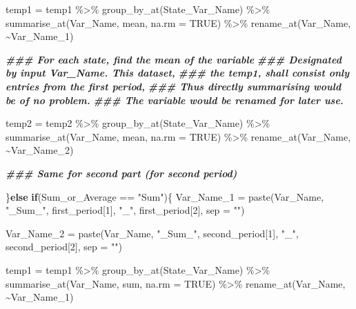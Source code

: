 \documentclass[
]{article}
\newenvironment{Shaded}{\begin{snugshade}}{\end{snugshade}}
\newcommand{\AttributeTok}[1]{\textcolor[rgb]{0.77,0.63,0.00}{#1}}
\newcommand{\ConstantTok}[1]{\textcolor[rgb]{0.00,0.00,0.00}{#1}}
\newcommand{\ControlFlowTok}[1]{\textcolor[rgb]{0.13,0.29,0.53}{\textbf{#1}}}
\newcommand{\DecValTok}[1]{\textcolor[rgb]{0.00,0.00,0.81}{#1}}
\newcommand{\DocumentationTok}[1]{\textcolor[rgb]{0.56,0.35,0.01}{\textbf{\textit{#1}}}}
\newcommand{\FunctionTok}[1]{\textcolor[rgb]{0.00,0.00,0.00}{#1}}
\newcommand{\NormalTok}[1]{#1}
\newcommand{\OtherTok}[1]{\textcolor[rgb]{0.56,0.35,0.01}{#1}}
\newcommand{\SpecialCharTok}[1]{\textcolor[rgb]{0.00,0.00,0.00}{#1}}
\newcommand{\StringTok}[1]{\textcolor[rgb]{0.31,0.60,0.02}{#1}}
\begin{document}
\begin{Shaded}
\begin{Highlighting}[]
\NormalTok{    temp1 }\OtherTok{=}\NormalTok{ temp1 }\SpecialCharTok{\%\textgreater{}\%} 
      \FunctionTok{group\_by\_at}\NormalTok{(State\_Var\_Name) }\SpecialCharTok{\%\textgreater{}\%}
      \FunctionTok{summarise\_at}\NormalTok{(Var\_Name, mean, }\AttributeTok{na.rm =} \ConstantTok{TRUE}\NormalTok{) }\SpecialCharTok{\%\textgreater{}\%}
      \FunctionTok{rename\_at}\NormalTok{(Var\_Name, }
                \SpecialCharTok{\textasciitilde{}}\NormalTok{Var\_Name\_1)}
    
    \DocumentationTok{\#\#\# For each state, find the mean of the variable}
    \DocumentationTok{\#\#\# Designated by input Var\_Name. This dataset,}
    \DocumentationTok{\#\#\# the temp1, shall consist only entries from the first period,}
    \DocumentationTok{\#\#\# Thus directly summarising would be of no problem.}
    \DocumentationTok{\#\#\# The variable would be renamed for later use.}
    
\NormalTok{    temp2 }\OtherTok{=}\NormalTok{ temp2 }\SpecialCharTok{\%\textgreater{}\%} 
      \FunctionTok{group\_by\_at}\NormalTok{(State\_Var\_Name) }\SpecialCharTok{\%\textgreater{}\%}
      \FunctionTok{summarise\_at}\NormalTok{(Var\_Name, mean, }\AttributeTok{na.rm =} \ConstantTok{TRUE}\NormalTok{) }\SpecialCharTok{\%\textgreater{}\%}
      \FunctionTok{rename\_at}\NormalTok{(Var\_Name, }
                \SpecialCharTok{\textasciitilde{}}\NormalTok{Var\_Name\_2)}
    
    \DocumentationTok{\#\#\# Same for second part (for second period)}

\NormalTok{  \}}\ControlFlowTok{else} \ControlFlowTok{if}\NormalTok{(Sum\_or\_Average }\SpecialCharTok{==} \StringTok{"Sum"}\NormalTok{)\{}
\NormalTok{    Var\_Name\_1 }\OtherTok{=} \FunctionTok{paste}\NormalTok{(Var\_Name, }\StringTok{"\_Sum\_"}\NormalTok{,}
\NormalTok{                             first\_period[}\DecValTok{1}\NormalTok{], }\StringTok{"\_"}\NormalTok{, first\_period[}\DecValTok{2}\NormalTok{],}
                             \AttributeTok{sep =} \StringTok{""}\NormalTok{)}
    
\NormalTok{    Var\_Name\_2 }\OtherTok{=} \FunctionTok{paste}\NormalTok{(Var\_Name, }\StringTok{"\_Sum\_"}\NormalTok{,}
\NormalTok{                             second\_period[}\DecValTok{1}\NormalTok{], }\StringTok{"\_"}\NormalTok{, second\_period[}\DecValTok{2}\NormalTok{],}
                             \AttributeTok{sep =} \StringTok{""}\NormalTok{)}
    
\NormalTok{    temp1 }\OtherTok{=}\NormalTok{ temp1 }\SpecialCharTok{\%\textgreater{}\%} 
      \FunctionTok{group\_by\_at}\NormalTok{(State\_Var\_Name) }\SpecialCharTok{\%\textgreater{}\%}
      \FunctionTok{summarise\_at}\NormalTok{(Var\_Name, sum, }\AttributeTok{na.rm =} \ConstantTok{TRUE}\NormalTok{) }\SpecialCharTok{\%\textgreater{}\%}
      \FunctionTok{rename\_at}\NormalTok{(Var\_Name, }
                \SpecialCharTok{\textasciitilde{}}\NormalTok{Var\_Name\_1)}
    

\end{Highlighting}
\end{Shaded}
\end{document}
